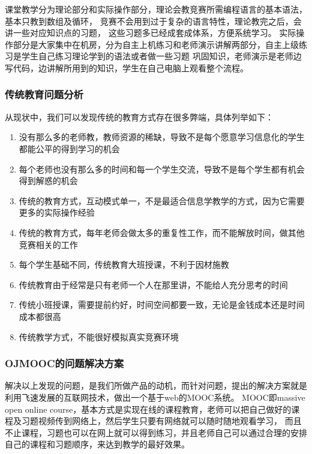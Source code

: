 \documentclass[UTF8,10pt,a4paper]{ctexart}
\begin{document}
     课堂教学分为理论部分和实际操作部分，理论会教竞赛所需编程语言的基本语法，基本只教到数组及循环，
     竞赛不会用到过于复杂的语言特性，理论教完之后，会讲一些对应知识点的习题，
     这些习题多已经成套成体系，方便系统学习。
     实际操作部分是大家集中在机房，分为自主上机练习和老师演示讲解两部分，自主上级练习是学生自己练习理论学到的语法或者做一些习题
     巩固知识，老师演示是老师边写代码，边讲解所用到的知识，学生在自己电脑上观看整个流程。

     \subsubsection{传统教育问题分析}
     从现状中，我们可以发现传统的教育方式存在很多弊端，具体列举如下：

     \begin{enumerate}
       \item 没有那么多的老师教，教师资源的稀缺，导致不是每个愿意学习信息化的学生都能公平的得到学习的机会
       \item 每个老师也没有那么多的时间和每一个学生交流，导致不是每个学生都有机会得到解惑的机会
       \item 传统的教育方式，互动模式单一，不是最适合信息学教学的方式，因为它需要更多的实际操作经验
       \item 传统的教育方式，每年老师会做太多的重复性工作，而不能解放时间，做其他竞赛相关的工作
       \item 每个学生基础不同，传统教育大班授课，不利于因材施教
       \item 传统教育由于经常是只有老师一个人在那里讲，不能给人充分思考的时间
       \item 传统小班授课，需要提前约好，时间空间都要一致，无论是金钱成本还是时间成本都很高
       \item 传统教学方式，不能很好模拟真实竞赛环境
     \end{enumerate}

     \subsubsection{OJMOOC的问题解决方案}
     解决以上发现的问题，是我们所做产品的动机，而针对问题，提出的解决方案就是利用飞速发展的互联网技术，做出一个基于web的MOOC系统。 MOOC即massive open online course，基本方式是实现在线的课程教育，老师可以把自己做好的课程及习题视频传到网络上，然后学生只要有网络就可以随时随地观看学习，
     而且不止课程，习题也可以在网上就可以得到练习，并且老师自己可以通过合理的安排自己的课程和习题顺序，来达到教学的最好效果。
\end{document}
